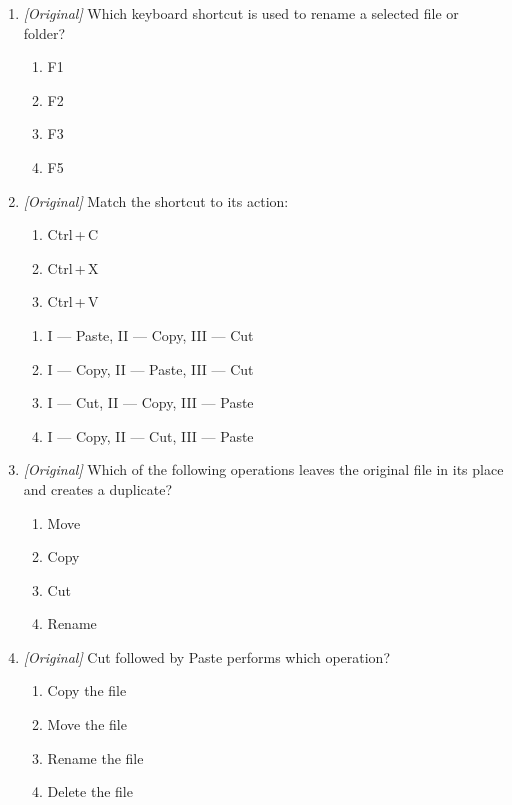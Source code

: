 \documentclass[11pt]{article}
\begin{document}
\begin{enumerate}[label=\textbf{Q\arabic*.}, leftmargin=*]
\begin{enumerate}[label=\Alph*.]
    \item Delete
    \item Alt\,+\,Delete
    \item Ctrl\,+\,Delete
    \item Shift\,+\,Delete
  \end{enumerate}
\item \textit{[Original]} Which keyboard shortcut is used to rename a selected
  file or folder?
  \begin{enumerate}[label=\Alph*.]
    \item F1
    \item F2
    \item F3
    \item F5
  \end{enumerate}
\item \textit{[Original]} Match the shortcut to its action:
  \begin{enumerate}[label=\Roman*.]
    \item Ctrl\,+\,C
    \item Ctrl\,+\,X
    \item Ctrl\,+\,V
  \end{enumerate}
  \begin{enumerate}[label=\Alph*.]
    \item I --- Paste, II --- Copy, III --- Cut
    \item I --- Copy, II --- Paste, III --- Cut
    \item I --- Cut, II --- Copy, III --- Paste
    \item I --- Copy, II --- Cut, III --- Paste
  \end{enumerate}
\item \textit{[Original]} Which of the following operations leaves the
  original file in its place and creates a duplicate?
  \begin{enumerate}[label=\Alph*.]
    \item Move
    \item Copy
    \item Cut
    \item Rename
  \end{enumerate}
\item \textit{[Original]} Cut followed by Paste performs which operation?
  \begin{enumerate}[label=\Alph*.]
    \item Copy the file
    \item Move the file
    \item Rename the file
    \item Delete the file

\end{enumerate}
\end{enumerate}
\end{document}
